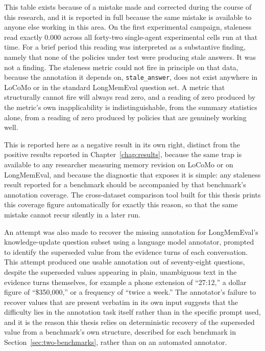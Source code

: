 This table exists because of a mistake made and corrected during the course of this research, and it is reported in full because the same mistake is available to anyone else working in this area. On the first experimental campaign, staleness read exactly 0.000 across all forty-two single-agent experimental cells run at that time. For a brief period this reading was interpreted as a substantive finding, namely that none of the policies under test were producing stale answers. It was not a finding. The staleness metric could not fire in principle on that data, because the annotation it depends on, \texttt{stale\_answer}, does not exist anywhere in LoCoMo or in the standard LongMemEval question set. A metric that structurally cannot fire will always read zero, and a reading of zero produced by the metric's own inapplicability is indistinguishable, from the summary statistics alone, from a reading of zero produced by policies that are genuinely working well.

This is reported here as a negative result in its own right, distinct from the positive results reported in Chapter~\ref{chap:results}, because the same trap is available to any researcher measuring memory revision on LoCoMo or on LongMemEval, and because the diagnostic that exposes it is simple: any staleness result reported for a benchmark should be accompanied by that benchmark's annotation coverage. The cross-dataset comparison tool built for this thesis prints this coverage figure automatically for exactly this reason, so that the same mistake cannot recur silently in a later run.

An attempt was also made to recover the missing annotation for LongMemEval's knowledge-update question subset using a language model annotator, prompted to identify the superseded value from the evidence turns of each conversation. This attempt produced one usable annotation out of seventy-eight questions, despite the superseded values appearing in plain, unambiguous text in the evidence turns themselves, for example a phone extension of ``27:12,'' a dollar figure of ``\$350,000,'' or a frequency of ``twice a week.'' The annotator's failure to recover values that are present verbatim in its own input suggests that the difficulty lies in the annotation task itself rather than in the specific prompt used, and it is the reason this thesis relies on deterministic recovery of the superseded value from a benchmark's own structure, described for each benchmark in Section~\ref{sec:two-benchmarks}, rather than on an automated annotator.

